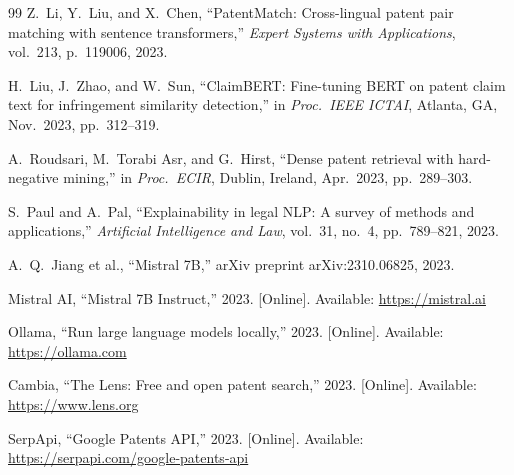 \documentclass[conference]{IEEEtran}
\begin{document}
\begin{thebibliography}{99}
Z.\ Li, Y.\ Liu, and X.\ Chen,
``PatentMatch: Cross-lingual patent pair matching with sentence
transformers,''
\textit{Expert Systems with Applications}, vol.\ 213, p.\ 119006, 2023.

H.\ Liu, J.\ Zhao, and W.\ Sun,
``ClaimBERT: Fine-tuning BERT on patent claim text for infringement
similarity detection,''
in \textit{Proc.\ IEEE ICTAI}, Atlanta, GA, Nov.\ 2023, pp.\ 312--319.

A.\ Roudsari, M.\ Torabi Asr, and G.\ Hirst,
``Dense patent retrieval with hard-negative mining,''
in \textit{Proc.\ ECIR}, Dublin, Ireland, Apr.\ 2023, pp.\ 289--303.

S.\ Paul and A.\ Pal,
``Explainability in legal NLP: A survey of methods and applications,''
\textit{Artificial Intelligence and Law}, vol.\ 31, no.\ 4,
pp.\ 789--821, 2023.

A.\ Q.\ Jiang et al.,
``Mistral 7B,''
arXiv preprint arXiv:2310.06825, 2023.

Mistral AI, ``Mistral 7B Instruct,'' 2023. [Online].
Available: \url{https://mistral.ai}

Ollama, ``Run large language models locally,'' 2023. [Online].
Available: \url{https://ollama.com}

Cambia, ``The Lens: Free and open patent search,'' 2023. [Online].
Available: \url{https://www.lens.org}

SerpApi, ``Google Patents API,'' 2023. [Online].
Available: \url{https://serpapi.com/google-patents-api}

\end{thebibliography}
\end{document}
